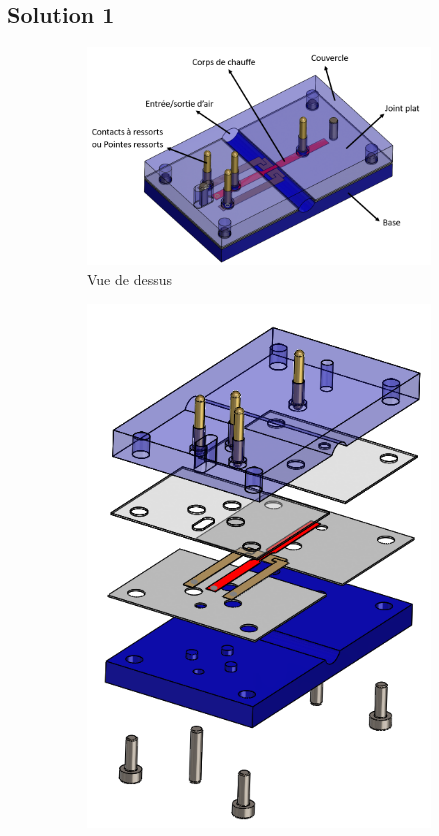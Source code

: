 \subsection{Solution 1}
\begin{figure}[H]
    \centering
    \begin{subfigure}{0.45\textwidth}
        \includegraphics[scale = 0.4]{images/Design1_dessus.png}
        \caption{Vue de dessus}
    \end{subfigure}
    \hspace{1.3cm}
    \begin{subfigure}{0.45\textwidth}
        \includegraphics[scale = 0.45]{assets/figures/design1_eclate.png}

\end{subfigure}
\end{figure}
